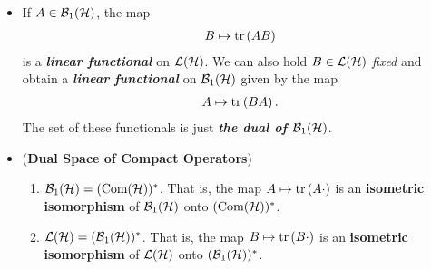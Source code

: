 \documentclass[11pt]{article}
\begin{document}
\begin{itemize}
\item \begin{remark}
If $A \in {\mathcal B}_1({\mathcal H})$, the map
\begin{align*}
B \mapsto \mathrm{tr}\left(AB \right)
\end{align*} is a \emph{\textbf{linear functional}} on ${\mathcal L}({\mathcal H})$. We can also hold $B \in {\mathcal L}({\mathcal H})$ \emph{fixed} and obtain a \emph{\textbf{linear functional}} on ${\mathcal B}_1({\mathcal H})$ given by the map 
\begin{align*}
A \mapsto \mathrm{tr}\left(BA \right).
\end{align*}
The set of these functionals is just \emph{\textbf{the dual of ${\mathcal B}_1({\mathcal H})$}}.
\end{remark}

\item \begin{proposition} (\textbf{Dual Space of Compact Operators}) \citep{reed1980methods}
\begin{enumerate}
\item ${\mathcal B}_1({\mathcal H}) = (\text{Com}({\mathcal H}))^{*}$.  That is, the map $A \mapsto \mathrm{tr}\left(A \cdot \right)$ is an \textbf{isometric isomorphism} of ${\mathcal B}_1({\mathcal H})$ onto $(\text{Com}({\mathcal H}))^{*}$. 
\item ${\mathcal L}({\mathcal H})= ({\mathcal B}_1({\mathcal H}))^{*}$.  That is, the map $B \mapsto \mathrm{tr}\left(B\cdot \right)$ is an \textbf{isometric isomorphism} of ${\mathcal L}({\mathcal H})$ onto $({\mathcal B}_1({\mathcal H}))^{*}$. 
\end{enumerate}
\end{proposition}
\end{itemize}

\newpage


\end{document}
